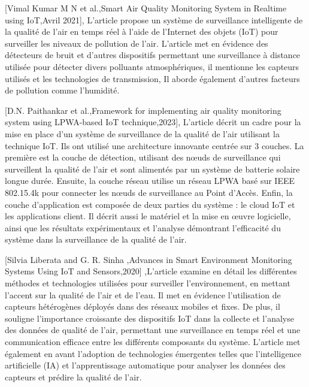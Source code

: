 \documentclass{report}
\begin{document}
\vspace*{0.5cm}

[Vimal Kumar M N et al.,Smart Air Quality Monitoring System in Realtime using IoT,Avril 2021], L'article propose un système de surveillance intelligente de la qualité de l'air en temps réel à l'aide de l'Internet des objets (IoT) pour surveiller les niveaux de pollution de l'air. L'article met en évidence des détecteurs de bruit et d'autres dispositifs permettant une surveillance à distance utilisée pour détecter divers polluants atmosphériques, il mentionne les capteurs utilisés et les technologies de transmission, Il aborde également d'autres facteurs de pollution comme l'humidité.

\vspace*{0.5cm}

[D.N. Paithankar et al.,Framework for implementing air quality monitoring system using LPWA-based IoT technique,2023], L'article décrit un cadre pour la mise en place d'un système de surveillance de la qualité de l'air utilisant la technique IoT. Ils ont utilisé une architecture innovante centrée sur 3 couches. La première est la couche de détection, utilisant des nœuds de surveillance qui surveillent la qualité de l'air et sont alimentés par un système de batterie solaire longue durée. Ensuite, la couche réseau utilise un réseau LPWA basé sur IEEE 802.15.4k pour connecter les nœuds de surveillance au Point d'Accès. Enfin, la couche d'application est composée de deux parties du système : le cloud IoT et les applications client.
Il décrit aussi le matériel et la mise en œuvre logicielle, ainsi que les résultats expérimentaux et l'analyse démontrant l'efficacité du système dans la surveillance de la qualité de l'air.

\vspace*{0.5cm}

[Silvia Liberata and G. R. Sinha ,Advances in Smart Environment Monitoring Systems Using IoT and Sensors,2020] ,L'article examine en détail les différentes méthodes et technologies utilisées pour surveiller l'environnement, en mettant l'accent sur la qualité de l'air et de l'eau. Il met en évidence l'utilisation de capteurs hétérogènes déployés dans des réseaux mobiles et fixes. De plus, il souligne l'importance croissante des dispositifs IoT dans la collecte et l'analyse des données de qualité de l'air, permettant une surveillance en temps réel et une communication efficace entre les différents composants du système. L'article met également en avant l'adoption de technologies émergentes telles que l'intelligence artificielle (IA) et l'apprentissage automatique pour analyser les données des capteurs et prédire la qualité de l'air.
\end{document}
